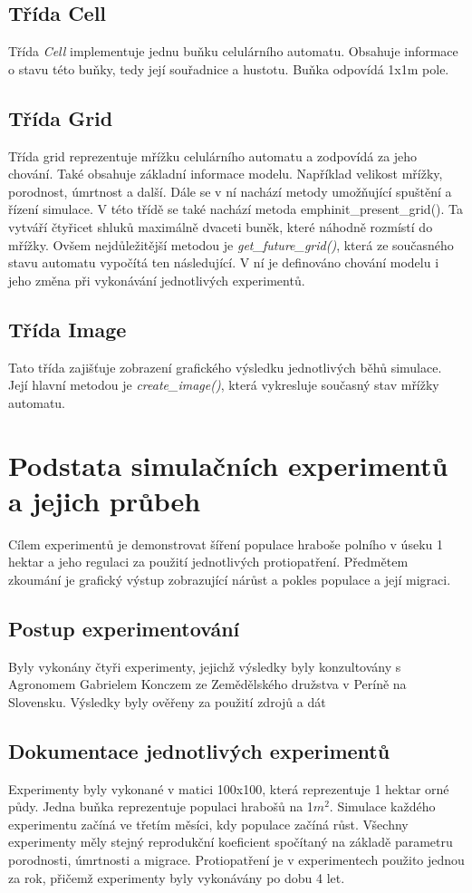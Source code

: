 \documentclass[a4paper,11pt]{article}
\begin{document}
\subsection{Třída Cell}
Třída \emph{Cell} implementuje jednu buňku celulárního automatu. Obsahuje informace o stavu této buňky, tedy její souřadnice a hustotu. Buňka odpovídá 1x1m pole.

\subsection{Třída Grid}
Třída grid reprezentuje mřížku celulárního automatu a zodpovídá za jeho chování. Také obsahuje základní informace modelu. Například velikost mřížky, porodnost, úmrtnost a další. Dále se v ní nachází metody umožňující spuštění a řízení simulace. V této třídě se také nachází metoda emph{init\_present\_grid()}. Ta vytváří čtyřicet shluků maximálně dvaceti buněk, které náhodně rozmístí do mřížky.
Ovšem nejdůležitější metodou je \emph{get\_future\_grid()}, která ze současného stavu automatu vypočítá ten následující. V ní je definováno chování modelu i jeho změna při vykonávání jednotlivých experimentů.

\subsection{Třída Image}
Tato třída zajišťuje zobrazení grafického výsledku jednotlivých běhů simulace. Její hlavní metodou je \emph{create\_image()}, která vykresluje současný stav mřížky automatu.


\section{Podstata simulačních experimentů a jejich průbeh}
Cílem experimentů je demonstrovat šíření populace hraboše polního v úseku 1 hektar a jeho regulaci za použití jednotlivých protiopatření. Předmětem zkoumání je grafický výstup zobrazující nárůst a pokles populace a její migraci. 
\subsection{Postup experimentování}
Byly vykonány čtyři experimenty, jejichž výsledky byly konzultovány s Agronomem Gabrielem Konczem ze Zemědělského družstva v Períně na Slovensku. Výsledky byly ověřeny za použití zdrojů a dát\cite{Voles-popul-data:online}
\subsection{Dokumentace jednotlivých experimentů}
Experimenty byly vykonané v matici 100x100, která reprezentuje 1 hektar orné půdy. Jedna buňka reprezentuje populaci hrabošů na 1$m^{2}$. Simulace každého experimentu začíná ve třetím měsíci, kdy populace začíná růst. Všechny experimenty měly stejný reprodukční koeficient spočítaný na základě parametru porodnosti, úmrtnosti a migrace. Protiopatření je v experimentech použito jednou za rok, přičemž experimenty byly vykonávány po dobu 4 let.
\end{document}

